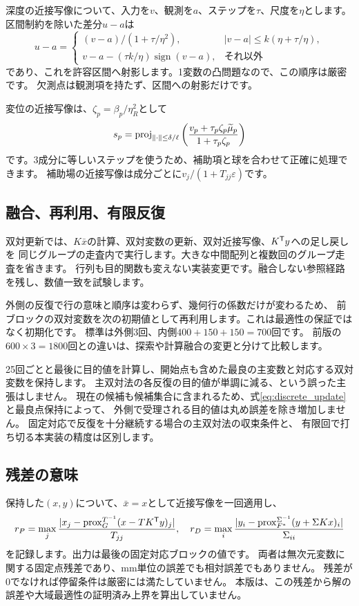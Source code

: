 \documentclass[a4paper,11pt]{ltjsarticle}
\newcommand{\prox}{\operatorname{prox}}\newcommand{\clip}{\operatorname{clip}}\newcommand{\proj}{\operatorname{proj}}
\theoremstyle{definition}
\begin{document}
深度の近接写像について、入力を$v$、観測を$a$、ステップを$\tau$、尺度を$\eta$とします。
区間制約を除いた差分$u-a$は
\begin{equation}\label{eq:depth_prox}
u-a=\begin{cases}
(v-a)/(1+\tau/\eta^2),&|v-a|\le k(\eta+\tau/\eta),\\
v-a-(\tau k/\eta)\operatorname{sign}(v-a),&\text{それ以外}
\end{cases}
\end{equation}
であり、これを許容区間へ射影します。1変数の凸問題なので、この順序は厳密です。
欠測点は観測項を持たず、区間への射影だけです。

変位の近接写像は、$\zeta_p=\beta_p/\eta_R^2$として
\begin{equation}\label{eq:scene_prox}
s_p=\proj_{\norm{\cdot}\le\delta/\ell}
\left(\frac{v_p+\tau_p\zeta_p\widetilde\mu_p}{1+\tau_p\zeta_p}\right)
\end{equation}
です。3成分に等しいステップを使うため、補助項と球を合わせて正確に処理できます。
補助場の近接写像は成分ごとに$v_j/(1+T_{jj}\varepsilon)$です。

\subsection{融合、再利用、有限反復}
双対更新では、$K\bar x$の計算、双対変数の更新、双対近接写像、$K^\mathsf T y$への足し戻しを
同じグループの走査内で実行します。大きな中間配列と複数回のグループ走査を省きます。
行列も目的関数も変えない実装変更です。融合しない参照経路を残し、数値一致を試験します。

外側の反復で行の意味と順序は変わらず、幾何行の係数だけが変わるため、
前ブロックの双対変数を次の初期値として再利用します。これは最適性の保証ではなく初期化です。
標準は外側3回、内側$400+150+150=700$回です。
前版の$600\times3=1800$回との違いは、探索や計算融合の変更と分けて比較します。

25回ごとと最後に目的値を計算し、開始点も含めた最良の主変数と対応する双対変数を保持します。
主双対法の各反復の目的値が単調に減る、という誤った主張はしません。
現在の候補も候補集合に含まれるため、式\eqref{eq:discrete_update}と最良点保持によって、
外側で受理される目的値は丸め誤差を除き増加しません。
固定対応で反復を十分継続する場合の主双対法の収束条件と、
有限回で打ち切る本実装の精度は区別します。

\subsection{残差の意味}
保持した$(x,y)$について、$\bar x=x$として近接写像を一回適用し、
\begin{equation}\label{eq:residual}
r_P=\max_j\frac{|x_j-\prox_G^{T^{-1}}(x-TK^\T y)_j|}{T_{jj}},\quad
r_D=\max_i\frac{|y_i-\prox_{F^*}^{\Sigma^{-1}}(y+\Sigma Kx)_i|}{\Sigma_{ii}}
\end{equation}
を記録します。出力は最後の固定対応ブロックの値です。
両者は無次元変数に関する固定点残差であり、mm単位の誤差でも相対誤差でもありません。
残差が0でなければ停留条件は厳密には満たしていません。
本版は、この残差から解の誤差や大域最適性の証明済み上界を算出していません。
\end{document}
